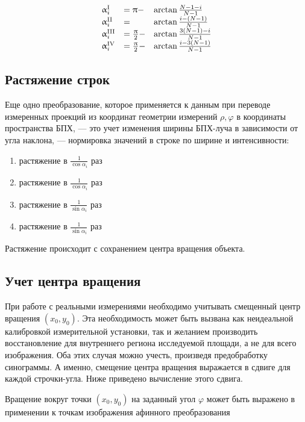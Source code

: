 \begin{equation}
\label{eq:fht_angle_space}
\begin{array}{lll}
\alpha^\rom{1}_i &= \pi - & \arctan{\frac{N-1-i}{N-1}} \\
\alpha^\rom{2}_i &= &\arctan{\frac{i - (N-1)}{N-1}} \\
\alpha^\rom{3}_i &= \frac \pi 2 - & \arctan{\frac{3(N-1)-i}{N-1}} \\
\alpha^\rom{4}_i &= \frac \pi 2 - & \arctan{\frac{i - 3(N-1)}{N-1}}
\end{array}
\end{equation}

\subsection{Растяжение строк}
Еще одно преобразование, которое применяется к данным при переводе измеренных проекций из координат геометрии измерений $\rho, \varphi$ в координаты пространства БПХ, --- это учет изменения ширины БПХ-луча в зависимости от угла наклона, --- нормировка значений в строке по ширине и интенсивности:
\begin{enumerate}[label=\Roman*.]
	\item растяжение в $\frac 1 {\cos \alpha_i}$ раз
	\item растяжение в $\frac 1 {\cos \alpha_i}$ раз
	\item растяжение в $\frac 1 {\sin \alpha_i}$ раз
	\item растяжение в $\frac 1 {\sin \alpha_i}$ раз
\end{enumerate}

Растяжение происходит с сохранением центра вращения объекта.

\subsection{Учет центра вращения}
При работе с реальными измерениями необходимо учитывать смещенный центр вращения $(x_0, y_0)$.
Эта необходимость может быть вызвана как неидеальной калибровкой измерительной установки, так и желанием производить восстановление для внутреннего региона исследуемой площади, а не для всего изображения.
Оба этих случая можно учесть, произведя предобработку синограммы.
А именно, смещение центра вращения выражается в сдвиге для каждой строчки-угла.
Ниже приведено вычисление этого сдвига.

Вращение вокруг точки $(x_0, y_0)$ на заданный угол $\varphi$ может быть выражено в применении к точкам изображения афинного преобразования

